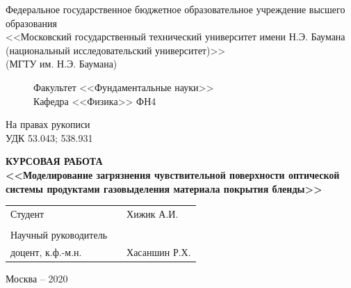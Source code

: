 \documentclass[
11pt,
master, %
subf, %
href, %
colorlinks=true, %
]{disser}
\begin{document}
\begin{titlepage}
\begin{center}
{
\footnotesize{}
Федеральное государственное бюджетное образовательное учреждение высшего образования\\
<<Московский государственный технический университет имени Н.Э. Баумана\\ (национальный исследовательский университет)>>\\(МГТУ им. Н.Э. Баумана)\\
}
\end{center}
\begin{figure}[h!]
    \begin{minipage}[b]{0.9\textwidth}
        \centering
        Факультет <<Фундаментальные науки>>\\
        Кафедра <<Физика>> ФН4\\\vspace{1.7cm}
    \end{minipage}
\end{figure}

\begin{flushright}
    На правах рукописи\\
    УДК 53.043; 538.931
\end{flushright}

\vspace{10mm}

\begin{center}
    \textbf{КУРСОВАЯ РАБОТА}\\
    \vspace{5mm}
    \textbf{<<Моделирование загрязнения чувствительной поверхности оптической системы продуктами газовыделения материала покрытия бленды>>}
    
\end{center}

\vspace{40mm}

\begin{table}[h]
    \begin{tabular}{lll}
    Студент\hspace{4cm} & \underline{\hspace{4cm}}  &  \hspace{2cm}Хижик А.И.\\ \\
    Научный руководитель \\доцент, к.ф.-м.н. & \underline{\hspace{4cm}} & \hspace{2cm}Хасаншин Р.Х.
    \end{tabular}
\end{table}

\vspace{50mm}

\begin{center}
    Москва -- 2020
\end{center}
\end{titlepage}
\end{document}
